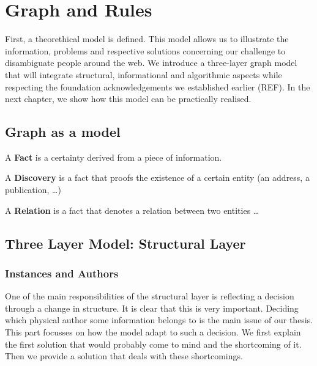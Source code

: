 \chapter{Graph and Rules}

First, a theorethical model is defined. This model allows us to illustrate the information, problems and respective solutions concerning our challenge to disambiguate people around the web. We introduce a three-layer graph model that will integrate structural, informational and algorithmic aspects while respecting the foundation acknowledgements we established earlier (REF). In the next chapter, we show how this model can be practically realised.

\section{Graph as a model}

\begin{mydef}
A \textbf{Fact} is a certainty derived from a piece of information.
\end{mydef}

\begin{mydef}
A \textbf{Discovery} is a fact that proofs the existence of a certain entity (an address, a publication, \ldots)
\end{mydef}

\begin{mydef}
A \textbf{Relation} is a fact that denotes a relation between two entities \ldots
\end{mydef}

\section{Three Layer Model: Structural Layer}


\subsection{Instances and Authors}

One of the main responsibilities of the structural layer is reflecting a decision through a change in structure. It is clear that this is very important. Deciding which physical author some information belongs to is the main issue of our thesis. This part focusses on how the model adapt to such a decision. We first explain the first solution that would probably come to mind and the shortcoming of it. Then we provide a solution that deals with these shortcomings.

